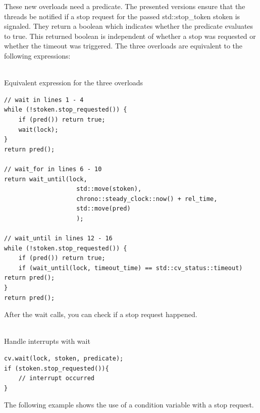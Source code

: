 These new overloads need a predicate. The presented versions ensure that the threads be notified if a stop request for the passed std::stop\_token stoken is signaled. They return a boolean which indicates whether the predicate evaluates to true. This returned boolean is independent of whether a stop was requested or whether the timeout was triggered. The three overloads are equivalent to the following expressions:

\hspace*{\fill} \\ %
\noindent
Equivalent expression for the three overloads
\begin{lstlisting}[style=styleCXX]
// wait in lines 1 - 4
while (!stoken.stop_requested()) {
	if (pred()) return true;
	wait(lock);
}
return pred();

// wait_for in lines 6 - 10
return wait_until(lock,
					std::move(stoken),
					chrono::steady_clock::now() + rel_time,
					std::move(pred)
					);

// wait_until in lines 12 - 16
while (!stoken.stop_requested()) {
	if (pred()) return true;
	if (wait_until(lock, timeout_time) == std::cv_status::timeout) return pred();
}
return pred();
\end{lstlisting}

After the wait calls, you can check if a stop request happened.

\hspace*{\fill} \\ %
\noindent
Handle interrupts with wait
\begin{lstlisting}[style=styleCXX]
cv.wait(lock, stoken, predicate);
if (stoken.stop_requested()){
	// interrupt occurred
}
\end{lstlisting}

The following example shows the use of a condition variable with a stop request.

